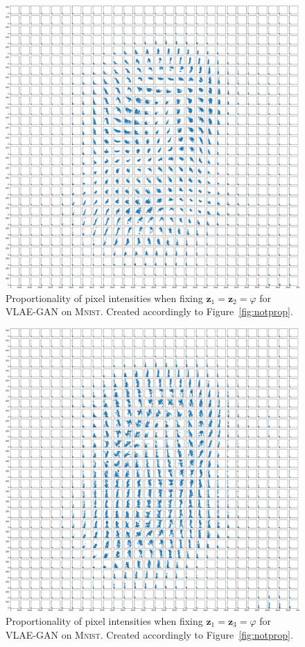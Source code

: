 \begin{figure}[H]
    \centering
    \includegraphics[width=\textwidth]{images/notprop/mnist/vlae_gan/ccs_0_1_vlae_gan.png}
    \caption[VLAE-GAN Pixel Proportionality - $\bm{z}_1$ vs. $\bm{z}_3$]{Proportionality of pixel intensities when fixing $\bm{z}_1 = \bm{z}_2=\varphi$ for \ac{VLAE}-\ac{GAN} on \textsc{Mnist}. Created accordingly to Figure~\ref{fig:notprop}.}
\end{figure}

\begin{figure}[H]
    \centering
    \includegraphics[width=\textwidth]{images/notprop/mnist/vlae_gan/ccs_0_2_vlae_gan.png}
    \caption[VLAE-GAN Pixel Proportionality - $\bm{z}_1$ vs. $\bm{z}_3$]{Proportionality of pixel intensities when fixing $\bm{z}_1 = \bm{z}_3=\varphi$ for \ac{VLAE}-\ac{GAN} on \textsc{Mnist}. Created accordingly to Figure~\ref{fig:notprop}.}
\end{figure}

